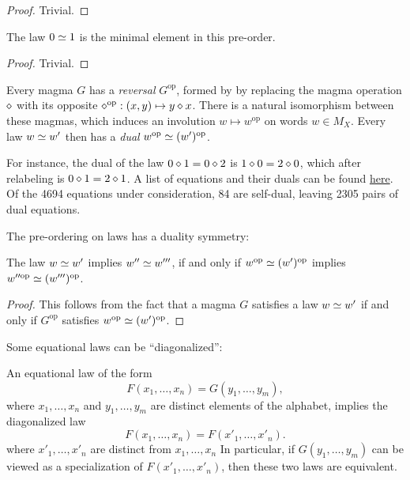 \begin{proof}
  Trivial.
\end{proof}

\begin{lemma}\label{minimal}\leanok
  The law $0  \simeq  1$ is the minimal element in this pre-order.
\end{lemma}

\begin{proof}
  Trivial.
\end{proof}

Every magma $G$ has a \emph{reversal} $G^{\mathrm{op}}$, formed by by replacing the magma operation
$\diamond$ with its opposite $\diamond^{\mathrm{op}}:(x,y) \mapsto y \diamond x$. There is a natural isomorphism
between these magmas, which induces an involution $w \mapsto w^{\mathrm{op}}$ on words $w \in M_X$.
Every law $w  \simeq  w'$ then has a \emph{dual} $w^{\mathrm{op}}  \simeq  (w')^{\mathrm{op}}$.

For instance, the dual of the law $0 \diamond 1 = 0 \diamond 2$ is $1 \diamond 0 = 2 \diamond 0$, which after relabeling
is $0 \diamond 1 = 2 \diamond 1$. A list of equations and their duals can be found
\href{https://github.com/teorth/equational_theories/blob/main/data/dual_equations.md}{here}.
Of the 4694 equations under consideration, 84 are self-dual, leaving 2305 pairs of dual equations.

The pre-ordering on laws has a duality symmetry:

\begin{lemma}\leanok\label{duality}
  The law $w \simeq w'$ implies $w''\simeq w'''$, if and only if $w^{\mathrm{op}} \simeq (w')^{\mathrm{op}}$ implies $w''^{\mathrm{op}} \simeq (w''')^{\mathrm{op}}$.
\end{lemma}

\begin{proof}
  This follows from the fact that a magma $G$ satisfies a law $w  \simeq  w'$ if and only if $G^{\mathrm{op}}$ satisfies $w^{\mathrm{op}}  \simeq  (w')^{\mathrm{op}}$.
\end{proof}

Some equational laws can be ``diagonalized'':

\begin{theorem}[Diagonalization]\label{diag}
  An equational law of the form
  \begin{equation}\label{prediag}
    F(x_1,\dots,x_n) = G(y_1,\dots,y_m),
  \end{equation}
  where $x_1,\dots,x_n$ and $y_1,\dots,y_m$ are distinct elements of the alphabet, implies the diagonalized law
  $$ F(x_1,\dots,x_n) = F(x'_1,\dots,x'_n).$$
  where $x'_1,\dots,x'_n$ are distinct from $x_1,\dots,x_n$
  In particular, if $G(y_1,\dots,y_m)$ can be viewed as a specialization of $F(x'_1,\dots,x'_n)$, then these two laws are equivalent.
\end{theorem}

